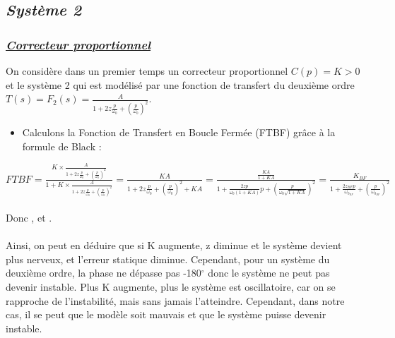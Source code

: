 \documentclass[12pt]{article}
\begin{document}
\subsection{\itshape Système 2}
\subsubsection{\underline{\itshape \bf Correcteur proportionnel}}
On considère dans un premier temps un correcteur proportionnel $C(p) = K > 0$ et le système 2 qui est modélisé par une fonction de transfert du deuxième ordre $T(s) = F_2(s) = \frac{A}{1 + 2z\frac{p}{\omega_0} + (\frac{p}{\omega_0})^2}$.
\begin{itemize}
    \item Calculons la Fonction de Transfert en Boucle Fermée (FTBF) grâce à la formule de Black : 
\end{itemize}

\large $FTBF = \frac{K\times \frac{A}{1 + 2z\frac{p}{\omega_0} + (\frac{p}{\omega_0})^2}}{1 + K\times \frac{A}{1 + 2z\frac{p}{\omega_0} + (\frac{p}{\omega_0})^2}} = \frac{KA}{1 + 2z\frac{p}{\omega_0} + (\frac{p}{\omega_0})^2 + KA} = \frac{\frac{KA}{1 + KA}}{1 + \frac{2zp}{\omega_0(1+KA)}p + (\frac{p}{\omega_0\sqrt{1+KA}})^2} = \frac{K_{BF}}{1 + \frac{2z_{BF}p}{\omega_{0_{BF}}}+ (\frac{p}{\omega_{0_{BF}}})^2}$
\\\\\normalsize Donc \large {},  \normalsize et \large {}.
\\\\ \normalsize Ainsi, on peut en déduire que si K augmente, z diminue et le système devient plus nerveux, et l'erreur statique diminue. Cependant, pour un système du deuxième ordre, la phase ne dépasse pas -180$^{\circ}$ donc le système ne peut pas devenir instable. Plus K augmente, plus le système est oscillatoire, car on se rapproche de l'instabilité, mais sans jamais l'atteindre. Cependant, dans notre cas, il se peut que le modèle soit mauvais et que le système puisse devenir instable.
\end{document}
